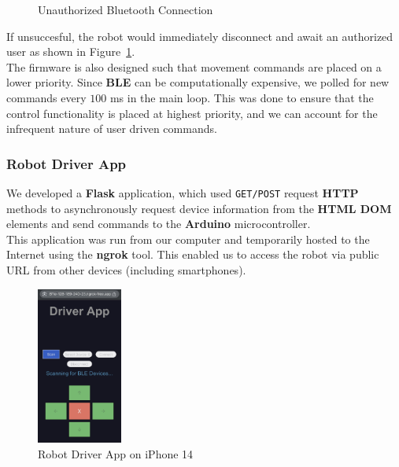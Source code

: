 \documentclass{article}
\begin{document}
\begin{figure}[H]
    \centering
    \caption{Unauthorized Bluetooth Connection}
    \label{fig:bluetooth_unauthorized}
\end{figure}

\begin{minipage}{\linewidth}
    If unsuccesful, the robot would immediately disconnect and await an authorized user as shown in Figure~\ref{fig:bluetooth_unauthorized}. \\

    The firmware is also designed such that movement commands are placed on a lower priority. Since \textbf{BLE} can be computationally expensive,
    we polled for new commands every $100$ ms in the main loop. This was done to ensure that the control functionality is placed at highest priority,
    and we can account for the infrequent nature of user driven commands.
\end{minipage}

\subsubsection{Robot Driver App}

\begin{minipage}{\linewidth}
    We developed a \textbf{Flask} application, which used \texttt{GET/POST} request \textbf{HTTP} methods
    to asynchronously request device information from the \textbf{HTML DOM} elements and send commands to the
    \textbf{Arduino} microcontroller. \\

    This application was run from our computer and temporarily hosted to the Internet using the \textbf{ngrok} tool.
    This enabled us to access the robot via public URL from other devices (including smartphones).
\end{minipage}\vspace{0.5cm}

\begin{figure}[H]
    \centering
    \includegraphics[width=0.25\textwidth]{Figures/Robot_Driver_App.jpg}
    \caption{Robot Driver App on iPhone 14}
    \label{fig:ble_app}
\end{figure}
\end{document}
